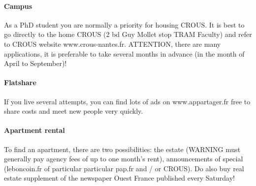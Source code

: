 \paragraph{Campus} As a PhD student you are normally a priority for housing CROUS. It is best to go directly to the home CROUS (2 bd Guy Mollet stop TRAM Faculty) and refer to CROUS website www.crous-nantes.fr. ATTENTION, there are many applications, it is preferable to take several months in advance (in the month of April to September)!


\paragraph{Flatshare} If you live several attempts, you can find lots of ads on www.appartager.fr free to share costs and meet new people very quickly.


\paragraph{Apartment rental} To find an apartment, there are two possibilities: the estate (WARNING must generally pay agency fees of up to one month's rent), announcements of special (leboncoin.fr of particular particular pap.fr and / or CROUS). Do also buy real estate supplement of the newspaper Ouest France published every Saturday!


